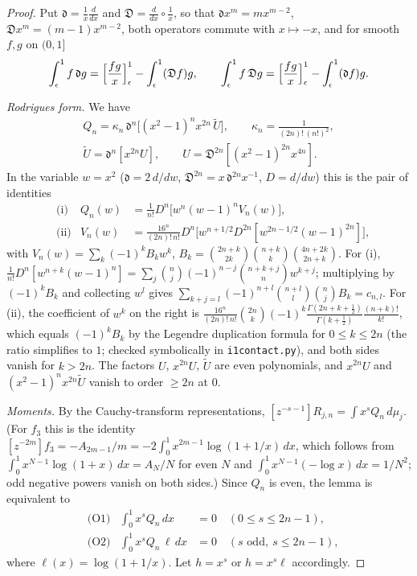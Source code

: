 \documentclass[11pt]{amsart}
\theoremstyle{definition}
\theoremstyle{remark}
\numberwithin{equation}{section}
\newcommand{\file}[1]{{\def\_{\textunderscore\allowbreak}\texttt{#1}}}
\begin{document}
\begin{proof}
Put $\mathfrak d=\frac1x\frac d{dx}$ and $\mathfrak D=\frac d{dx}\circ\frac1x$, so that $\mathfrak dx^m=mx^{m-2}$,
$\mathfrak Dx^m=(m-1)x^{m-2}$, both operators commute with $x\mapsto-x$, and for smooth $f,g$ on $(0,1]$
\[
\int_\epsilon^1f\,\mathfrak dg=\Bigl[\frac{fg}x\Bigr]_\epsilon^1-\int_\epsilon^1(\mathfrak Df)g,\qquad
\int_\epsilon^1f\,\mathfrak Dg=\Bigl[\frac{fg}x\Bigr]_\epsilon^1-\int_\epsilon^1(\mathfrak df)g .
\]

\emph{Rodrigues form.} We have
\[
\begin{gathered}
Q_n=\kappa_n\,\mathfrak d^n\bigl[(x^2-1)^nx^{2n}\,\tilde U\bigr],\qquad\kappa_n=\frac1{(2n)!\,(n!)^2},\\
\tilde U=\mathfrak d^n[x^{2n}U],\qquad U=\mathfrak D^{2n}[(x^2-1)^{2n}x^{4n}].
\end{gathered}
\]
In the variable $w=x^2$ ($\mathfrak d=2\,d/dw$, $\mathfrak D^{2n}=x\,\mathfrak d^{2n}x^{-1}$, $D=d/dw$) this is the pair of
identities
\[
\begin{aligned}
&\text{(i)}&Q_n(w)&=\frac1{n!}D^n\bigl[w^n(w-1)^nV_n(w)\bigr],\\
&\text{(ii)}&V_n(w)&=\frac{16^n}{(2n)!\,n!}D^n\bigl[w^{n+1/2}D^{2n}[w^{2n-1/2}(w-1)^{2n}]\bigr],
\end{aligned}
\]
with $V_n(w)=\sum_k(-1)^kB_kw^k$, $B_k=\binom{2n+k}{2k}\binom{n+k}{k}\binom{4n+2k}{2n+k}$. For (i),
$\frac1{n!}D^n[w^{n+k}(w-1)^n]=\sum_j\binom nj(-1)^{n-j}\binom{n+k+j}{n}w^{k+j}$; multiplying by $(-1)^kB_k$ and
collecting $w^l$ gives $\sum_{k+j=l}(-1)^{n+l}\binom{n+l}{l}\binom nj B_k=c_{n,l}$. For (ii), the coefficient of $w^k$ on
the right is $\frac{16^n}{(2n)!\,n!}\binom{2n}k(-1)^k\frac{\Gamma(2n+k+\frac12)}{\Gamma(k+\frac12)}\frac{(n+k)!}{k!}$,
which equals $(-1)^kB_k$ by the Legendre duplication formula for $0\le k\le2n$ (the ratio simplifies to $1$; checked
symbolically in \file{i1\_contact.py}), and both sides vanish for $k>2n$. The factors $U$, $x^{2n}U$, $\tilde U$ are even
polynomials, and $x^{2n}U$ and $(x^2-1)^nx^{2n}\tilde U$ vanish to order $\ge2n$ at $0$.

\emph{Moments.} By the Cauchy-transform representations, $[z^{-s-1}]R_{j,n}=\int x^sQ_n\,d\mu_j$. (For $f_3$ this is the
identity $[z^{-2m}]f_3=-A_{2m-1}/m=-2\int_0^1x^{2m-1}\log(1+1/x)\,dx$, which follows from
$\int_0^1x^{N-1}\log(1+x)\,dx=A_N/N$ for even $N$ and $\int_0^1x^{N-1}(-\log x)\,dx=1/N^2$; odd negative powers vanish on
both sides.) Since $Q_n$ is even, the lemma is equivalent to
\[
\begin{aligned}
&\text{(O1)}&\int_0^1x^sQ_n\,dx&=0\quad(0\le s\le2n-1),\\
&\text{(O2)}&\int_0^1x^sQ_n\,\ell\,dx&=0\quad(s\text{ odd},\ s\le2n-1),
\end{aligned}
\]
where $\ell(x)=\log(1+1/x)$. Let $h=x^s$ or $h=x^s\ell$ accordingly.


\end{proof}
\end{document}
